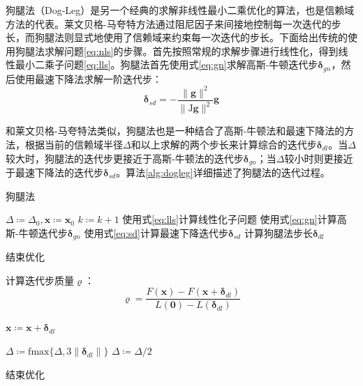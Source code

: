 狗腿法（Dog-Leg）是另一个经典的求解非线性最小二乘优化的算法，也是信赖域方法的代表。莱文贝格-马夸特方法通过阻尼因子来间接地控制每一次迭代的步长，而狗腿法则显式地使用了信赖域来约束每一次迭代的步长。下面给出传统的使用狗腿法求解问题\eqref{eq:nls}的步骤\citep{tingleff2004methods}。首先按照常规的求解步骤进行线性化，得到线性最小二乘子问题\eqref{eq:lls}。狗腿法首先使用式\eqref{eq:gn}求解高斯-牛顿迭代步$\bm{\delta}_{gn}$，然后使用最速下降法求解一阶迭代步：
\begin{equation}
    \bm{\delta}_{sd} = -\frac{\lVert\bm{g}\rVert^2}
                             {\lVert\mathrm{J}\bm{g}\rVert^2} \bm{g}
    \label{eq:sd}
\end{equation}

和莱文贝格-马夸特法类似，狗腿法也是一种结合了高斯-牛顿法和最速下降法的方法，根据当前的信赖域半径$\Delta$和以上求解的两个步长来计算综合的迭代步$\bm{\delta}_{dl}$。当$\Delta$较大时，狗腿法的迭代步更接近于高斯-牛顿法的迭代步$\bm{\delta}_{gn}$；当$\Delta$较小时则更接近于最速下降法的迭代步$\bm{\delta}_{sd}$。算法\ref{alg:dogleg}详细描述了狗腿法的迭代过程。

\begin{algorithm}[htb!]
\caption{狗腿法}
\begin{algorithmic}
    \State $\Delta \coloneqq \Delta_0, \bm{x} \coloneqq \bm{x}_0$
        \State $k \coloneqq k+1$
        \State 使用式\eqref{eq:lls}计算线性化子问题
        \State 使用式\eqref{eq:gn}计算高斯-牛顿迭代步$\bm{\delta}_{gn}$
        \State 使用式\eqref{eq:sd}计算最速下降迭代步$\bm{\delta}_{sd}$
        \State 计算狗腿法步长$\bm{\delta}_{dl}$

            \State 结束优化
        \EndIf

        \State 计算迭代步质量$\varrho$：
        \[
            \varrho = \frac {F(\bm{x})-F(\bm{x}+\bm{\delta}_{dl})}
                            {L(\bm{0})-L(\bm{\delta}_{dl})}
        \]

            \State $\bm{x} \coloneqq \bm{x} + \bm{\delta}_{dl}$
        \EndIf

            \State $\Delta \coloneqq \text{fmax}\{\Delta,3\lVert\bm{\delta}_{dl}\rVert\}$
            \State $\Delta \coloneqq \Delta/2$
        \EndIf

            \State 结束优化
        \EndIf
    \EndFor
\end{algorithmic}
\label{alg:dogleg}
\end{algorithm}

